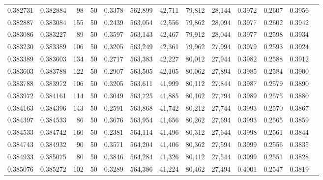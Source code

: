 \begin{tabular}{rrrrrrrrrrrrr}
0.382731 & 0.382884 &    98 &  50 &                                     0.3378 & 562,899 &  42,711 &  79,812 &  28,144 & 0.3972 & 0.2607 & 0.3956 \\
0.382887 & 0.383084 &   155 &  50 &                                     0.2439 & 563,054 &  42,556 &  79,862 &  28,094 & 0.3977 & 0.2602 & 0.3942 \\
0.383086 & 0.383227 &    89 &  50 &                                     0.3597 & 563,143 &  42,467 &  79,912 &  28,044 & 0.3977 & 0.2598 & 0.3934 \\
0.383230 & 0.383389 &   106 &  50 &                                     0.3205 & 563,249 &  42,361 &  79,962 &  27,994 & 0.3979 & 0.2593 & 0.3924 \\
0.383389 & 0.383603 &   134 &  50 &                                     0.2717 & 563,383 &  42,227 &  80,012 &  27,944 & 0.3982 & 0.2588 & 0.3912 \\
0.383603 & 0.383788 &   122 &  50 &                                     0.2907 & 563,505 &  42,105 &  80,062 &  27,894 & 0.3985 & 0.2584 & 0.3900 \\
0.383788 & 0.383972 &   106 &  50 &                                     0.3205 & 563,611 &  41,999 &  80,112 &  27,844 & 0.3987 & 0.2579 & 0.3890 \\
0.383972 & 0.384161 &   114 &  50 &                                     0.3049 & 563,725 &  41,885 &  80,162 &  27,794 & 0.3989 & 0.2575 & 0.3880 \\
0.384163 & 0.384396 &   143 &  50 &                                     0.2591 & 563,868 &  41,742 &  80,212 &  27,744 & 0.3993 & 0.2570 & 0.3867 \\
0.384397 & 0.384533 &    86 &  50 &                                     0.3676 & 563,954 &  41,656 &  80,262 &  27,694 & 0.3993 & 0.2565 & 0.3859 \\
0.384533 & 0.384742 &   160 &  50 &                                     0.2381 & 564,114 &  41,496 &  80,312 &  27,644 & 0.3998 & 0.2561 & 0.3844 \\
0.384743 & 0.384932 &    90 &  50 &                                     0.3571 & 564,204 &  41,406 &  80,362 &  27,594 & 0.3999 & 0.2556 & 0.3835 \\
0.384933 & 0.385075 &    80 &  50 &                                     0.3846 & 564,284 &  41,326 &  80,412 &  27,544 & 0.3999 & 0.2551 & 0.3828 \\
0.385076 & 0.385272 &   102 &  50 &                                     0.3289 & 564,386 &  41,224 &  80,462 &  27,494 & 0.4001 & 0.2547 & 0.3819 \\

\end{tabular}
